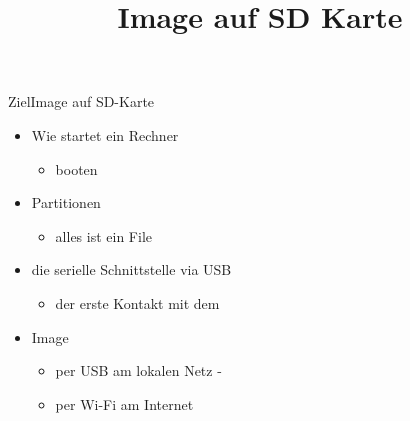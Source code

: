 \documentclass{beamer}
\title{Image auf SD Karte}
\begin{document}
\frame{\titlepage}

\begin{frame}{Ziel}{Image auf SD-Karte}
 \begin{itemize}
  \item Wie startet ein Rechner
  \begin{itemize}
   \item booten
  \end{itemize}
  \item Partitionen
  \begin{itemize}
   \item alles ist ein File
  \end{itemize}
  \item die serielle Schnittstelle via USB
  \begin{itemize}
   \item der erste Kontakt mit dem \target
  \end{itemize}
  \item Image
  \begin{itemize}
   \item per USB am lokalen Netz \host - \targetS
   \item per Wi-Fi am Internet
  \end{itemize}
 \end{itemize}
\end{frame}





\end{document}

